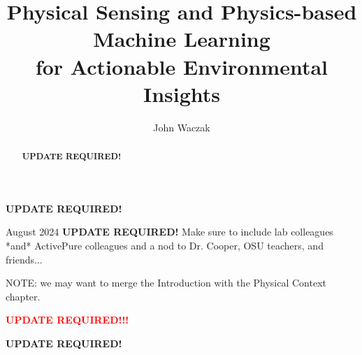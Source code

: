 \documentclass[doublespacing]{utdthesis}
\author{John Waczak}
\title{Physical Sensing and Physics-based Machine Learning \\ for Actionable Environmental Insights}
\begin{document}
\frontmatter

\signaturepage


\begin{dedication} %
  \color{red}
  \textbf{UPDATE REQUIRED!}
\end{dedication}


\maketitle

\begin{acks}{August 2024} %
  \color{red}
  \textbf{UPDATE REQUIRED!} Make sure to include lab colleagues *and* ActivePure colleagues and a nod to Dr. Cooper, OSU teachers, and friends...
\end{acks}

\begin{abstract}
  \color{red}
  \textbf{UPDATE REQUIRED!}
\end{abstract}

\tableofcontents
\listoffigures %
\listoftables %

\mainmatter


NOTE: we may want to merge the Introduction with the Physical Context chapter.

% 










\appendix %









\begin{thesisbib}  %
  
\end{thesisbib}  %

\begin{biosketch}
  \textcolor{red}{\textbf{UPDATE REQUIRED!!!}}
\end{biosketch}


\begin{vita}  %
  \textbf{UPDATE REQUIRED!}
\end{vita}  %
\end{document}
